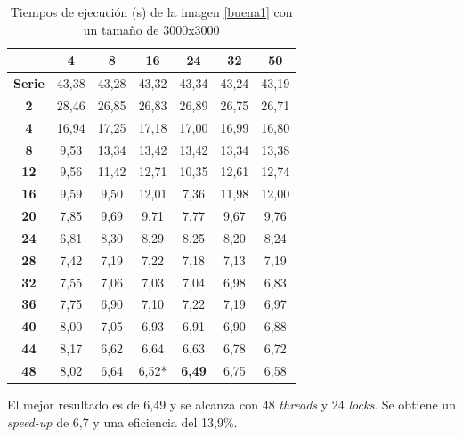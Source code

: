 \begin{table}[H]
	\centering
	\small
	\begin{tabular}{|c|c|c|c|c|c|c|}
		\hline
		{\bf }   & {\bf 4} & {\bf 8} & {\bf 16} & {\bf 24} & {\bf 32} & {\bf 50} \\ \hline
		{\bf Serie}  & 43,38   & 43,28   & 43,32    & 43,34    & 43,24    & 43,19    \\ \hline
		{\bf 2}  & 28,46   & 26,85   & 26,83    & 26,89    & 26,75    & 26,71    \\ \hline
		{\bf 4}  & 16,94   & 17,25   & 17,18    & 17,00    & 16,99    & 16,80    \\ \hline
		{\bf 8}  & 9,53    & 13,34   & 13,42    & 13,42    & 13,34    & 13,38    \\ \hline
	    {\bf 12} & 9,56    & 11,42   & 12,71    & 10,35    & 12,61    & 12,74    \\ \hline
		{\bf 16} & 9,59    & 9,50    & 12,01    & 7,36     & 11,98    & 12,00    \\ \hline
		{\bf 20} & 7,85    & 9,69    & 9,71     & 7,77     & 9,67     & 9,76     \\ \hline
		{\bf 24} & 6,81    & 8,30    & 8,29     & 8,25     & 8,20     & 8,24     \\ \hline
		{\bf 28} & 7,42    & 7,19    & 7,22     & 7,18     & 7,13     & 7,19     \\ \hline
		{\bf 32} & 7,55    & 7,06    & 7,03     & 7,04     & 6,98     & 6,83     \\ \hline
		{\bf 36} & 7,75    & 6,90    & 7,10     & 7,22     & 7,19     & 6,97     \\ \hline
		{\bf 40} & 8,00    & 7,05    & 6,93     & 6,91     & 6,90     & 6,88     \\ \hline
		{\bf 44} & 8,17    & 6,62    & 6,64     & 6,63     & 6,78     & 6,72     \\ \hline
		{\bf 48} & 8,02    & 6,64    & 6,52*     & \textbf{6,49}     & 6,75     & 6,58     \\ \hline
	\end{tabular}
	\captionsetup{justification=centering}	
	\caption{Tiempos de ejecuci\'{o}n (s) de la imagen \ref{buena1} con un tama\~{n}o de 3000x3000}
	\label{img1-3000}
\end{table}

El mejor resultado es de 6,49 y se alcanza con 48 \textit{threads} y 24 \textit{locks}. Se obtiene un \textit{speed-up} de 6,7 y una eficiencia del 13,9\%.

